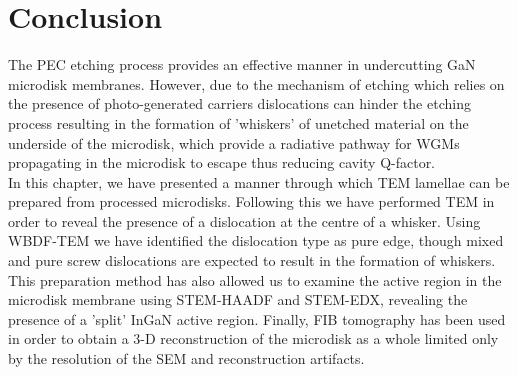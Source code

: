 \section{Conclusion}

The PEC etching process provides an effective manner in undercutting GaN microdisk membranes. However, due to the mechanism of etching which relies on the presence of photo-generated carriers dislocations can hinder the etching process resulting in the formation of 'whiskers' of unetched material on the underside of the microdisk, which provide a radiative pathway for WGMs propagating in the microdisk to escape thus reducing cavity Q-factor.\\
In this chapter, we have presented a manner through which TEM lamellae can be prepared from processed microdisks. Following this we have performed TEM in order to reveal the presence of a dislocation at the centre of a whisker. Using WBDF-TEM we have identified the dislocation type as pure edge, though mixed and pure screw dislocations are expected to result in the formation of whiskers. This preparation method has also allowed us to examine the active region in the microdisk membrane using STEM-HAADF and STEM-EDX, revealing the presence of a 'split' InGaN active region. Finally, FIB tomography has been used in order to obtain a 3-D reconstruction of the microdisk as a whole limited only by the resolution of the SEM and reconstruction artifacts.







